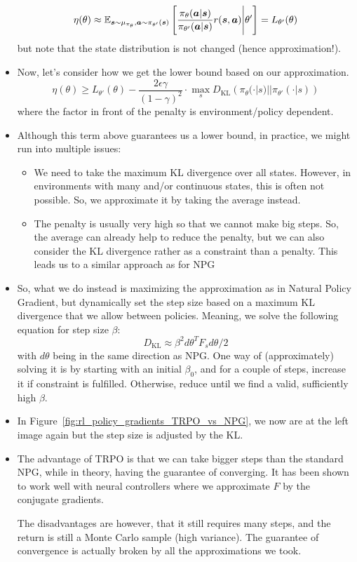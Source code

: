 \begin{itemize}
	$$\eta(\theta)\approx \mathbb{E}_{\bm{s}\sim \mu_{\pi_{\theta}},\bm{a}\sim \pi_{\theta'} (\bm{s})}\left[\frac{\pi_{\theta}(\bm{a}|\bm{s})}{\pi_{\theta'}(\bm{a}|\bm{s})}r(\bm{s},\bm{a})\Bigg\vert \theta' \right]=L_{\theta'}(\theta)$$
	but note that the state distribution is not changed (hence approximation!).
	\item Now, let's consider how we get the lower bound based on our approximation. 
	$$\eta(\theta)\geq L_{\theta'}(\theta) - \frac{2\epsilon \gamma}{(1-\gamma)^2}\cdot \max_s D_{\text{KL}}\left(\pi_{\theta}(\cdot|s)||\pi_{\theta'}(\cdot|s)\right)$$
	where the factor in front of the penalty is environment/policy dependent. 
	\item Although this term above guarantees us a lower bound, in practice, we might run into multiple issues:
	\begin{itemize}
		\item We need to take the maximum KL divergence over all states. However, in environments with many and/or continuous states, this is often not possible. So, we approximate it by taking the average instead.
		\item The penalty is usually very high so that we cannot make big steps. So, the average can already help to reduce the penalty, but we can also consider the KL divergence rather as a constraint than a penalty. This leads us to a similar approach as for NPG
	\end{itemize}
	\item So, what we do instead is maximizing the approximation as in Natural Policy Gradient, but dynamically set the step size based on a maximum KL divergence that we allow between policies. Meaning, we solve the following equation for step size $\beta$:
	$$D_{\text{KL}} \approx \beta^2 d\theta^T F_s d\theta / 2$$
	with $d\theta$ being in the same direction as NPG. One way of (approximately) solving it is by starting with an initial $\beta_0$, and for a couple of steps, increase it if constraint is fulfilled. Otherwise, reduce until we find a valid, sufficiently high $\beta$.
	
	\item In Figure~\ref{fig:rl_policy_gradients_TRPO_vs_NPG}, we now are at the left image again but the step size is adjusted by the KL.
	\item The advantage of TRPO is that we can take bigger steps than the standard NPG, while in theory, having the guarantee of converging. It has been shown to work well with neural controllers where we approximate $F$ by the conjugate gradients. 
	
	The disadvantages are however, that it still requires many steps, and the return is still a Monte Carlo sample (high variance). The guarantee of convergence is actually broken by all the approximations we took.
\end{itemize}

